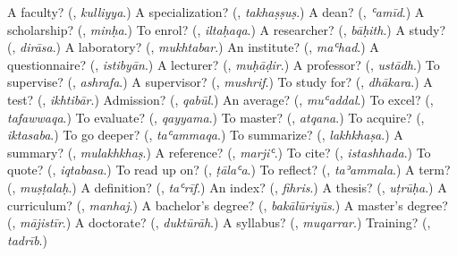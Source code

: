 \begin{tcolorbox}[breakable,colback=teal!4,colframe=teal!35!black,title={Before you move on}]
A faculty? (\textbf{}, \emph{kulliyya}.) A specialization? (\textbf{}, \emph{takhaṣṣuṣ}.) A dean? (\textbf{}, \emph{ʿamīd}.) A scholarship? (\textbf{}, \emph{minḥa}.) To enrol? (\textbf{}, \emph{iltaḥaqa}.) A researcher? (\textbf{}, \emph{bāḥith}.) A study? (\textbf{}, \emph{dirāsa}.) A laboratory? (\textbf{}, \emph{mukhtabar}.) An institute? (\textbf{}, \emph{maʿhad}.) A questionnaire? (\textbf{}, \emph{istibyān}.) A lecturer? (\textbf{}, \emph{muḥāḍir}.) A professor? (\textbf{}, \emph{ustādh}.) To supervise? (\textbf{}, \emph{ashrafa}.) A supervisor? (\textbf{}, \emph{mushrif}.) To study for? (\textbf{}, \emph{dhākara}.) A test? (\textbf{}, \emph{ikhtibār}.) Admission? (\textbf{}, \emph{qabūl}.) An average? (\textbf{}, \emph{muʿaddal}.) To excel? (\textbf{}, \emph{tafawwaqa}.) To evaluate? (\textbf{}, \emph{qayyama}.) To master? (\textbf{}, \emph{atqana}.) To acquire? (\textbf{}, \emph{iktasaba}.) To go deeper? (\textbf{}, \emph{taʿammaqa}.) To summarize? (\textbf{}, \emph{lakhkhaṣa}.) A summary? (\textbf{}, \emph{mulakhkhaṣ}.) A reference? (\textbf{}, \emph{marjiʿ}.) To cite? (\textbf{}, \emph{istashhada}.) To quote? (\textbf{}, \emph{iqtabasa}.) To read up on? (\textbf{}, \emph{ṭālaʿa}.) To reflect? (\textbf{}, \emph{taʾammala}.) A term? (\textbf{}, \emph{muṣṭalaḥ}.) A definition? (\textbf{}, \emph{taʿrīf}.) An index? (\textbf{}, \emph{fihris}.) A thesis? (\textbf{}, \emph{uṭrūḥa}.) A curriculum? (\textbf{}, \emph{manhaj}.) A bachelor's degree? (\textbf{}, \emph{bakālūriyūs}.) A master's degree? (\textbf{}, \emph{mājistīr}.) A doctorate? (\textbf{}, \emph{duktūrāh}.) A syllabus? (\textbf{}, \emph{muqarrar}.) Training? (\textbf{}, \emph{tadrīb}.)
\end{tcolorbox}
